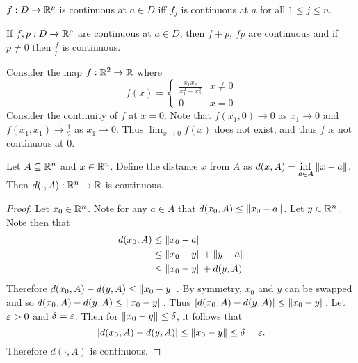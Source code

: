 \documentclass[../main.tex]{subfiles}
\begin{document}
\begin{corollary}
    $f: D \to \mathbb{R}^p$ is continuous at $a \in D$ iff $f_j$ is continuous at $a$ for all $1 \leq j \leq n$.
\end{corollary}

\begin{corollary}
    If $f, p: D \to \mathbb{R}^p$ are continuous at $a \in D$, then $f+p$, $fp$ are continuous and if $p \neq 0$ then $\frac{f}{p}$ is continuous.
\end{corollary}

\begin{example}
    Consider the map $f : \mathbb{R}^2 \to \mathbb{R}$ where
    \[
        f(x) = \begin{cases}
            \frac{x_1 x_2}{x_1^2 + x_2^2} & x \neq 0 \\
            0 & x = 0
        \end{cases}
    \]
    Consider the continuity of $f$ at $x = 0$. Note that $f(x_1, 0) \to 0$ as $x_1 \to 0$ and $f(x_1, x_1) \to \frac{1}{2}$ as $x_1 \to 0$. Thus $\displaystyle\lim_{x \to 0} f(x)$ does not exist, and thus $f$ is not continuous at $0$.
\end{example}

\begin{example}
    \label{ex:dist_continuous}
    Let $A \subseteq \mathbb{R}^n$ and $x \in \mathbb{R}^n$. Define the distance $x$ from $A$ as $d(x,A) = \displaystyle\inf_{a \in A} \norm{x - a}$. Then $d(\cdot, A) : \mathbb{R}^n \to \mathbb{R}$ is continuous.

    \begin{proof}
        Let $x_0 \in \mathbb{R}^n$. Note for any $a \in A$ that $d(x_0, A) \leq \norm{x_0 - a}$. Let $y \in \mathbb{R}^n$. Note then that
        \begin{align*}
            d(x_0, A) &\leq \norm{x_0 - a} \\
                      &\leq \norm{x_0 - y} + \norm{y - a} \\
                      &\leq \norm{x_0 - y} + d(y, A)
        \end{align*}
        Therefore $d(x_0, A) - d(y, A) \leq \norm{x_0 - y}$. By symmetry, $x_0$ and $y$ can be swapped and so $d(x_0, A) - d(y, A) \leq \norm{x_0 - y}$. Thus $|d(x_0, A) - d(y, A)| \leq \norm{x_0 - y}$. Let $\varepsilon > 0$ and $\delta = \varepsilon$. Then for $\norm{x_0 - y} \leq \delta$, it follows that
        \[
            |d(x_0, A) - d(y, A)| \leq \norm{x_0 - y} \leq \delta = \varepsilon
        .\]
        Therefore $d(\cdot, A)$ is continuous.
    \end{proof}
\end{example}
\end{document}
